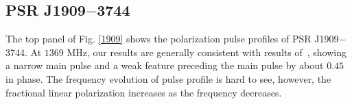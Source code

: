 \documentclass[useAMS,usenatbib]{mn2e}
\begin{document}

\subsection{PSR J1909$-$3744}

The top panel of Fig. \ref{1909} shows the polarization pulse profiles of 
PSR J1909$-$3744.
%
At $1369$ MHz, our results are generally consistent with results of~\citet{Ord04,Yan11}, 
showing a narrow main pulse and a weak feature preceding the main pulse by 
about $0.45$ in phase.
%
The frequency evolution of pulse profile is hard to see, however, the fractional 
linear polarization increases as the frequency decreases.

\end{document}
